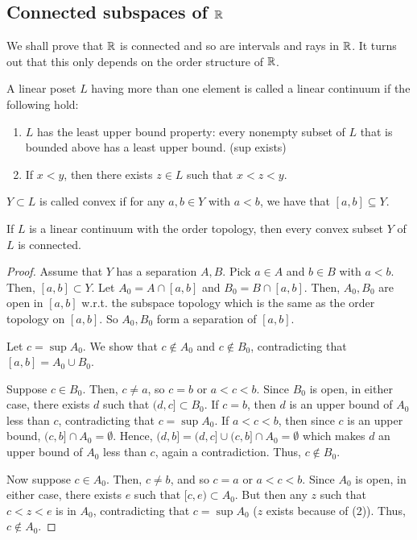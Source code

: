 \subsection{Connected subspaces of $\mathbb{R}$}

We shall prove that $\mathbb{R}$ is connected and so are intervals and rays in $\mathbb{R}$. It turns out that this only depends on the order structure of $\mathbb{R}$.

\begin{definition}
    A linear poset $L$ having more than one element is called a linear continuum if the following hold:
    \begin{enumerate}
        \item $L$ has the least upper bound property: every nonempty subset of $L$ that is bounded above has a least upper bound. (sup exists)
        \item If $x<y$, then there exists  $z\in L$ such that $x<z<y$.
    \end{enumerate}
\end{definition}

\begin{definition}
    $Y\subset L$ is called convex if for any $a,b\in Y$ with $a<b$, we have that $[a,b]\subseteq Y$.
\end{definition}

\begin{theorem}
    If $L$ is a linear continuum with the order topology, then every convex subset $Y$ of $L$ is connected.
\end{theorem}
\begin{proof}
    Assume that $Y$ has a separation $A,B$. Pick $a\in A$ and $b\in B$ with $a<b$. Then, $[a,b]\subset Y$. Let $A_0=A\cap [a,b]$ and $B_0=B\cap [a,b]$. Then, $A_0,B_0$ are open in $[a,b]$ w.r.t. the subspace topology which is the same as the order topology on $[a,b]$. So $A_0,B_0$ form a separation of $[a,b]$.

    Let $c=\sup A_0$. We show that $c\notin A_0$ and $c\notin B_0$, contradicting that $[a,b]=A_0\cup B_0$.

    Suppose $c\in B_0$. Then, $c\neq a$, so $c=b$ or $a<c<b$. Since $B_0$ is open, in either case, there exists $d$ such that $(d,c]\subset B_0$. If $c=b$, then $d$ is an upper bound of $A_0$ less than $c$, contradicting that $c=\sup A_0$. If $a<c<b$, then since $c$ is an upper bound, $(c,b]\cap A_0=\emptyset.$ Hence, $(d,b]=(d,c]\cup (c,b]\cap A_0=\emptyset$ which makes $d$ an upper bound of $A_0$ less than $c$, again a contradiction. Thus, $c\notin B_0$.

    Now suppose $c\in A_0$. Then, $c\neq b$, and so $c=a$ or $a<c<b$. Since $A_0$ is open, in either case, there exists $e$ such that $[c,e)\subset A_0$. But then any $z$ such that $c<z<e$ is in $A_0$, contradicting that $c=\sup A_0$ ($z$ exists because of (2)). Thus, $c\notin A_0$.
\end{proof}


